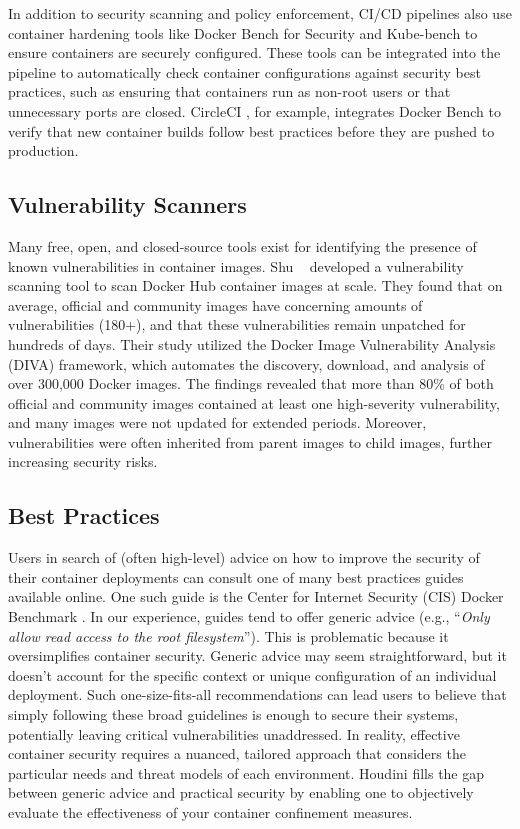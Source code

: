 \begin{doublespace}
In addition to security scanning and policy enforcement, CI/CD pipelines also use container hardening tools like Docker Bench for Security \cite{docker_bench} and Kube-bench \cite{kube_bench} to ensure containers are securely configured. These tools can be integrated into the pipeline to automatically check container configurations against security best practices, such as ensuring that containers run as non-root users or that unnecessary ports are closed. CircleCI \cite{circleci}, for example, integrates Docker Bench to verify that new container builds follow best practices before they are pushed to production.\\

\subsection{Vulnerability Scanners} 

Many free, open, and closed-source tools exist for identifying the presence of known vulnerabilities in container images. Shu \etal~\cite{shu2017study} developed a vulnerability scanning tool to scan Docker Hub container images at scale. They found that on average, official and community images have concerning amounts of vulnerabilities (180+), and that these vulnerabilities remain unpatched for hundreds of days. Their study utilized the Docker Image Vulnerability Analysis (DIVA) framework, which automates the discovery, download, and analysis of over 300,000 Docker images. The findings revealed that more than 80\% of both official and community images contained at least one high-severity vulnerability, and many images were not updated for extended periods. Moreover, vulnerabilities were often inherited from parent images to child images, further increasing security risks.\\

\subsection{Best Practices} 

Users in search of (often high-level) advice on how to improve the security of their container deployments can consult one of many best practices guides available online. One such guide is the Center for Internet Security (CIS) Docker Benchmark \cite{CIS}. In our experience, guides tend to offer generic advice (e.g., ``\textit{Only allow read access to the root filesystem}''). This is problematic because it oversimplifies container security. Generic advice may seem straightforward, but it doesn't account for the specific context or unique configuration of an individual deployment. Such one-size-fits-all recommendations can lead users to believe that simply following these broad guidelines is enough to secure their systems, potentially leaving critical vulnerabilities unaddressed. In reality, effective container security requires a nuanced, tailored approach that considers the particular needs and threat models of each environment. Houdini fills the gap between generic advice and practical security by enabling one to objectively evaluate the effectiveness of your container confinement measures.\\


\end{doublespace}
